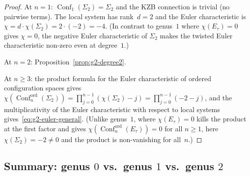 \documentclass[11pt,reqno]{amsart}
\theoremstyle{definition}
\theoremstyle{remark}
\DeclareMathOperator{\Conf}{Conf}
\numberwithin{equation}{section}
\begin{document}
\begin{proof}
At $n = 1$: $\Conf_1(\Sigma_2) = \Sigma_2$ and the KZB
connection is trivial (no pairwise terms).
The local system has rank~$d = 2$ and the Euler
characteristic is
$\chi = d \cdot \chi(\Sigma_2) = 2 \cdot (-2) = -4$.
(In contrast to genus~$1$ where $\chi(E_\tau) = 0$
gives $\chi = 0$, the negative Euler characteristic of
$\Sigma_2$ makes the twisted Euler characteristic non-zero
even at degree~$1$.)

At $n = 2$: Proposition~\ref{prop:g2-degree2}.

At $n \geq 3$: the product formula for the Euler
characteristic of ordered configuration spaces gives
$\chi(\Conf_n^{\mathrm{ord}}(\Sigma_2))
= \prod_{j=0}^{n-1}(\chi(\Sigma_2) - j)
= \prod_{j=0}^{n-1}(-2 - j)$, and
the multiplicativity of the Euler characteristic with
respect to local systems
gives~\eqref{eq:g2-euler-general}.
(Unlike genus~$1$, where $\chi(E_\tau) = 0$ kills the
product at the first factor and gives
$\chi(\Conf_n^{\mathrm{ord}}(E_\tau)) = 0$ for all
$n \geq 1$, here $\chi(\Sigma_2) = -2 \neq 0$ and the
product is non-vanishing for all~$n$.)
\end{proof}

\subsection{Summary: genus $0$ vs.\ genus $1$ vs.\
genus $2$}
\label{subsec:genus-comparison-table}
\end{document}

